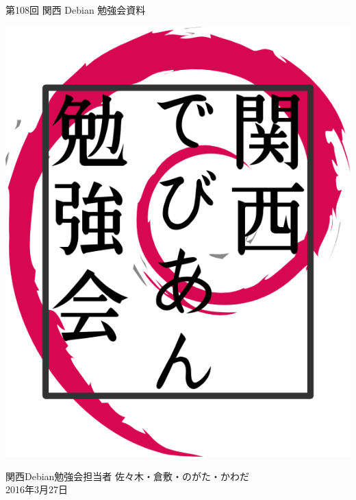\documentclass[mingoth,a4paper]{jsarticle}
\newcommand{\debmtgyear}{2016}
\newcommand{\debmtgdate}{27}
\newcommand{\debmtgmonth}{3}
\newcommand{\debmtgnumber}{108}
\begin{document}
\begin{titlepage}


  第\debmtgnumber{}回 関西 Debian 勉強会資料

  \vspace{2cm}

  \begin{center}
    \includegraphics{image200802/kansaidebianlogo.png}
  \end{center}

  \begin{flushright}
    \hfill{}関西Debian勉強会担当者 佐々木・倉敷・のがた・かわだ \\
    \hfill{}\debmtgyear{}年\debmtgmonth{}月\debmtgdate{}日
  \end{flushright}

  \thispagestyle{empty}
\end{titlepage}

\end{document}
